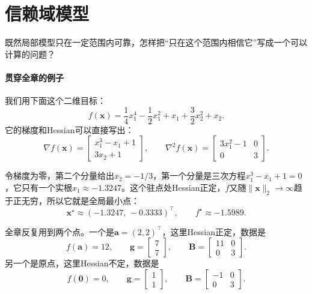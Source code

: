 \section{信赖域模型}
\label{sec:tr-model}

既然局部模型只在一定范围内可靠，怎样把“只在这个范围内相信它”写成一个可以计算的问题？

\paragraph{贯穿全章的例子}
我们用下面这个二维目标：
\begin{equation}
 f(\bm{x})=\frac14x_1^4-\frac12x_1^2+x_1+\frac32x_2^2+x_2.
 \label{eq:tr-example}
\end{equation}
它的梯度和Hessian可以直接写出：
\begin{equation}
 \nabla f(\bm{x})=\begin{bmatrix}x_1^3-x_1+1\\3x_2+1\end{bmatrix},\qquad
 \nabla^2 f(\bm{x})=\begin{bmatrix}3x_1^2-1&0\\0&3\end{bmatrix}.
 \label{eq:tr-example-derivatives}
\end{equation}

令梯度为零，第二个分量给出$x_2=-1/3$，第一个分量是三次方程$x_1^3-x_1+1=0$，它只有一个实根$x_1\approx-1.3247$。这个驻点处Hessian正定，$f$又随$\lVert\bm{x}\rVert_2\to\infty$趋于正无穷，所以它就是全局最小点：
\[
 \bm{x}^\star\approx(-1.3247,\,-0.3333)^\top,\qquad f^\star\approx-1.5989.
\]

全章反复用到两个点。一个是$\bm{a}=(2,2)^\top$，这里Hessian正定，数据是
\begin{equation}
 f(\bm{a})=12,\qquad \bm{g}=\begin{bmatrix}7\\7\end{bmatrix},\qquad \bm{B}=\begin{bmatrix}11&0\\0&3\end{bmatrix}.
 \label{eq:tr-data-a}
\end{equation}
另一个是原点，这里Hessian不定，数据是
\begin{equation}
 f(\bm{0})=0,\qquad \bm{g}=\begin{bmatrix}1\\1\end{bmatrix},\qquad \bm{B}=\begin{bmatrix}-1&0\\0&3\end{bmatrix}.
 \label{eq:tr-data-o}
\end{equation}


